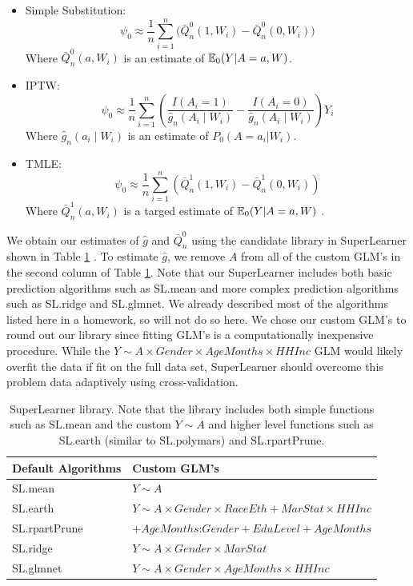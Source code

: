 \documentclass{article}
\begin{document}
\begin{itemize}
  \item Simple Substitution:
    \[
      \psi_0 \approx \frac{1}{n}\sum_{i=1}^{n}\Big(\bar{Q}_{n}^{0}(1,W_i) - \bar{Q}_{n}^{0}(0,W_i)\Big)
    \]
Where $\bar{Q}_{n}^{0}(a,W_i)$ is an estimate of $\mathbb{E}_0(Y|A=a,W)$.
  \item IPTW:
  \[
    \psi_{0} \approx \frac{1}{n}\sum_{i=1}^{n} \left(\frac{I(A_i=1)}{\hat{g}_n(A_i \mid W_i)} - \frac{I(A_i=0)}{\hat{g}_n(A_i \mid W_i)} \right)Y_i
  \]
Where $\hat{g}_n(a_i \mid W_i)$ is an estimate of $P_0(A=a_i|W_i)$.
  \item TMLE:
  \[
    \psi_{0} \approx \frac{1}{n}\sum_{i=1}^{n}\left( \bar{Q}_{n}^{1}(1,W_i) - \bar{Q}_{n}^{1}(0,W_i)\right)
  \]
Where $\bar{Q}_{n}^{1}(a,W_i)$ is a targed estimate of $\mathbb{E}_0(Y|A=a,W)$ \cite{tmle}.
\end{itemize}

We obtain our estimates of $\hat{g}$ and $\bar{Q}_n^0$ using the candidate library in SuperLearner shown in Table \ref{tab:sl.lib} \cite{superlearner}. To estimate $\hat{g}$, we remove $A$ from all of the custom GLM's in the second column of Table \ref{tab:sl.lib}. Note that our SuperLearner includes both basic prediction algorithms such as SL.mean and more complex prediction algorithms such as SL.ridge and SL.glmnet. We already described most of the algorithms listed here in a homework, so will not do so here. We chose our custom GLM's to round out our library since fitting GLM's is a computationally inexpensive procedure. While the $Y \sim A \times Gender \times AgeMonths \times HHInc$ GLM would likely overfit the data if fit on the full data set, SuperLearner should overcome this problem data adaptively using cross-validation.
\begin{table}[h!]
\begin{tabular}{l | l}
Default Algorithms & Custom GLM's \\
\hline
SL.mean & $Y \sim A$ \\
SL.earth & $Y \sim A \times Gender \times RaceEth + MarStat \times HHInc$ \\
SL.rpartPrune & $+ AgeMonths$:$Gender + EduLevel + AgeMonths $ \\
SL.ridge & $Y \sim A \times Gender \times MarStat$ \\
SL.glmnet &  $Y \sim A \times Gender \times AgeMonths \times HHInc$ \\
\end{tabular}
\caption{SuperLearner library. Note that the library includes both simple functions such as SL.mean and the custom $Y\sim A$ and higher level functions such as SL.earth (similar to SL.polymars) and SL.rpartPrune.}
\label{tab:sl.lib}
\end{table}
\end{document}
